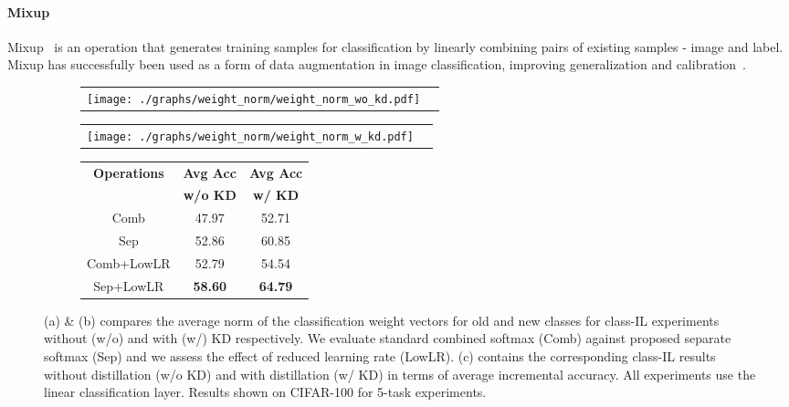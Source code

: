 \documentclass[final]{cvpr}
\begin{document}
\paragraph{Mixup}
Mixup~\cite{mixup} is an operation that generates training samples for classification by linearly combining pairs of existing samples - image and label. 
Mixup has successfully been used as a form of data augmentation in image classification, improving generalization and calibration~\cite{mixup, thulasidasanmixup}. 



\begin{figure*}[!t]
\centering
\begin{subfigure}[b]{.3\textwidth}
 \begin{tabular}{cc}
\centering
\texttt{[image: ./graphs/weight\_norm/weight\_norm\_wo\_kd.pdf]} 
\end{tabular}
  \caption{}
  \label{fig:weight_norm_wo_kd}
\end{subfigure}\begin{subfigure}[b]{.3\textwidth}
 \begin{tabular}{cc}
\centering
\texttt{[image: ./graphs/weight\_norm/weight\_norm\_w\_kd.pdf]} 
\end{tabular}
  \caption{}
  \label{fig:weight_norm_w_kd}
\end{subfigure}\begin{subfigure}[b]{.35\textwidth}
 \begin{tabular}{|c|c|c|} 
 \hline
 \multirow{2}{*}{\textbf{Operations}}   & \textbf{Avg Acc}   & \textbf{Avg Acc}  \\ [0.5ex] 
 & \textbf{w/o KD} & \textbf{w/ KD}\\
 \hline
 \hline

    Comb                        & {47.97}           & 52.71 \\ 
    \hline
    Sep                         & {52.86}           & 60.85 \\
      \hline
   Comb+LowLR                   & 52.79             & 54.54        \\
      \hline
    Sep+LowLR                   & \textbf{58.60}     & \textbf{64.79}        \\
    \hline
    \end{tabular}
    \vspace{10px}
     \caption{}
    \label{tab:weight_norm}
\end{subfigure}
\caption{ (a) \& (b) compares the average  norm of the classification weight vectors for old and new classes for class-IL experiments without (w/o) and with (w/) KD respectively. We evaluate standard combined softmax (Comb) against proposed separate softmax (Sep) and we assess the effect of reduced learning rate (LowLR). (c) contains the corresponding class-IL results without distillation (w/o KD) and with distillation (w/ KD) in terms of average incremental accuracy. All experiments use the linear classification layer. Results shown on CIFAR-100 for 5-task experiments. } \label{fig:weight_norm_fig_tab}
\end{figure*}
\end{document}
